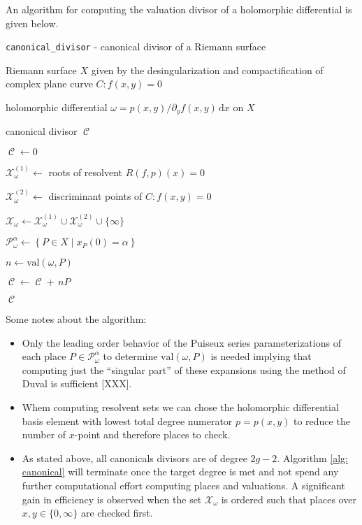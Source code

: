 \documentclass[12pt]{article}
\theoremstyle{definition}
\newcommand{\dx}{\,\mathrm{d}x}
\DeclareMathOperator{\DivC}{\mathcal{C}}
\begin{document}
An algorithm for computing the valuation divisor of a holomorphic
differential is given below.
\begin{algorithm}[H]
\caption{{\tt canonical\_divisor} - canonical divisor of a Riemann surface}
\label{alg: canonical}
\begin{algorithmic}[1]
  \Require Riemann surface $X$ given by the desingularization and
  compactification of complex plane curve $C : f(x,y) = 0$

  \Require holomorphic differential $\omega = p(x,y) / \partial_y f(x,y)
  \dx$ on $X$

  \Ensure canonical divisor $\DivC$

  \State $\DivC \gets 0$

  \State $\mathcal{X}_\omega^{(1)} \gets$ roots of resolvent $R(f,p)(x)
  = 0$

  \State $\mathcal{X}_\omega^{(2)} \gets$ discriminant points of $C :
  f(x,y) = 0$ 

  \State $\mathcal{X}_\omega \gets \mathcal{X}_\omega^{(1)} \cup
  \mathcal{X}_\omega^{(2)} \cup \{ \infty \}$


  \State $\mathcal{P}_\omega^\alpha \gets \left\{ P \in X \; | \; x_P(0)
  = \alpha \right\}$


  \State $n \gets \text{val}\left(\omega,P\right)$

  \State $\DivC \gets \DivC + \,n P$

  \If{$\deg \DivC = 2g - 2$}
  \State \Return $\DivC$
  \EndIf

  \EndFor

  \EndFor


\end{algorithmic}
\end{algorithm}

Some notes about the algorithm:
\begin{itemize}
\item Only the leading order behavior of the Puiseux series
  parameterizations of each place $P \in \mathcal{P}_\omega^\alpha$ to
  determine $\text{val}(\omega,P)$ is needed implying that computing
  just the ``singular part'' of these expansions using the method of
  Duval is sufficient [XXX].
\item Whem computing resolvent sets we can chose the holomorphic
  differential basis element with lowest total degree numerator
  $p=p(x,y)$ to reduce the number of $x$-point and therefore places to
  check.
\item As stated above, all canonicals divisors are of degree
  $2g-2$. Algorithm \ref{alg: canonical} will terminate once the target
  degree is met and not spend any further computational effort computing
  places and valuations. A significant gain in efficiency is observed
  when the set $\mathcal{X}_\omega$ is ordered such that places over
  $x,y \in \{0,\infty\}$ are checked first.
\end{itemize}
\end{document}
